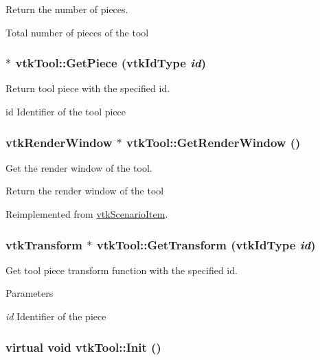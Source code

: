 Return the number of pieces. 

Total number of pieces of the tool \hypertarget{classvtkTool_a4316c5cd3281c663da03f6854c350788}{
\subsubsection[{GetPiece}]{ $\ast$ vtkTool::GetPiece (vtkIdType {\em id})}}
\label{classvtkTool_a4316c5cd3281c663da03f6854c350788}


Return tool piece with the specified id. 

id Identifier of the tool piece \hypertarget{classvtkTool_ab156b5e1d4a9974b6b4a9809fdb10dc1}{
\subsubsection[{GetRenderWindow}]{\setlength{\rightskip}{0pt plus 5cm}vtkRenderWindow $\ast$ vtkTool::GetRenderWindow ()}}
\label{classvtkTool_ab156b5e1d4a9974b6b4a9809fdb10dc1}


Get the render window of the tool. 

Return the render window of the tool 

Reimplemented from \hyperlink{classvtkScenarioItem_a9d7908b11d2a477827342c05bb505e66}{vtkScenarioItem}.

\hypertarget{classvtkTool_aa7c8e40f5216213e56cc7307bd16460a}{
\subsubsection[{GetTransform}]{\setlength{\rightskip}{0pt plus 5cm}vtkTransform $\ast$ vtkTool::GetTransform (vtkIdType {\em id})}}
\label{classvtkTool_aa7c8e40f5216213e56cc7307bd16460a}


Get tool piece transform function with the specified id. 


\begin{DoxyParams}{Parameters}
\item[{\em id}]Identifier of the piece \end{DoxyParams}
\hypertarget{classvtkTool_a6b9e7743cde1b61b252abef17248a913}{
\subsubsection[{Init}]{\setlength{\rightskip}{0pt plus 5cm}virtual void vtkTool::Init ()}}
\label{classvtkTool_a6b9e7743cde1b61b252abef17248a913}


